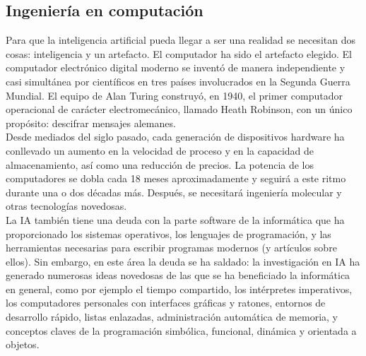 \documentclass[12pt,a4paper]{report}
\begin{document}
\subsection*{Ingeniería en computación}
Para que la inteligencia artificial pueda llegar a ser una realidad se necesitan dos cosas: inteligencia y un artefacto. El computador ha sido el artefacto elegido. El computador electrónico digital moderno se inventó de manera independiente y casi simultánea por científicos en tres países involucrados en la Segunda Guerra Mundial. El equipo de Alan Turing construyó, en 1940, el primer computador operacional de carácter electromecánico, llamado Heath Robinson, con un único propósito: descifrar mensajes alemanes.\\
Desde mediados del siglo pasado, cada generación de dispositivos hardware ha conllevado un aumento en la velocidad de proceso y en la capacidad de almacenamiento, así como una reducción de precios. La potencia de los computadores se dobla cada 18 meses aproximadamente y seguirá a este ritmo durante una o dos décadas más. Después, se necesitará ingeniería molecular y otras tecnologías novedosas.\\
La IA también tiene una deuda con la parte software de la informática que ha proporcionado los sistemas operativos, los lenguajes de programación, y las herramientas necesarias para escribir programas modernos (y artículos sobre ellos). Sin embargo, en este área la deuda se ha saldado: la investigación en IA ha generado numerosas ideas novedosas de las que se ha beneficiado la informática en general, como por ejemplo el tiempo compartido, los intérpretes imperativos, los computadores personales con interfaces gráficas y ratones, entornos de desarrollo rápido, listas enlazadas, administración automática de memoria, y conceptos claves de la programación simbólica, funcional, dinámica y orientada a objetos.
\end{document}
